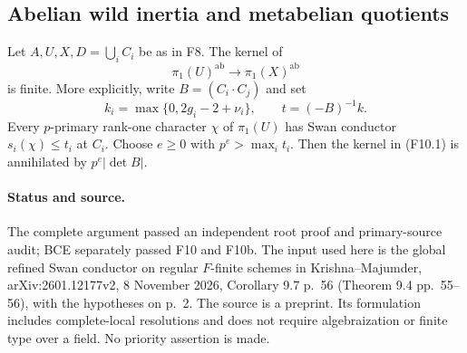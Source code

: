 \subsection{Abelian wild inertia and metabelian quotients}

\begin{proposition}
Let $A,U,X,D=\bigcup_iC_i$ be as in F8. The kernel of
\[
 \pi_1(U)^{\mathrm{ab}}\longrightarrow\pi_1(X)^{\mathrm{ab}}
 \tag{F10.1}
\]
is finite. More explicitly, write $B=(C_i\cdot C_j)$ and set
\[
 k_i=\max\{0,2g_i-2+\nu_i\},\qquad
 t=(-B)^{-1}k.
 \tag{F10.2}
\]
Every $p$-primary rank-one character $\chi$ of $\pi_1(U)$ has
Swan conductor $s_i(\chi)\leq t_i$ at $C_i$.
Choose $e\geq0$ with $p^e>\max_i t_i$. Then the kernel in
(F10.1) is annihilated by $p^e|\det B|$.
\end{proposition}

\paragraph{Status and source.}
The complete argument passed an independent root proof and primary-source
audit; BCE separately passed F10 and F10b. The input used here is the
global refined Swan conductor on regular $F$-finite
schemes in Krishna--Majumder, arXiv:2601.12177v2, 8 November 2026,
Corollary 9.7 p.~56 (Theorem 9.4 pp.~55--56), with the hypotheses
on p.~2. The source is a preprint. Its formulation includes
complete-local resolutions and does not require algebraization
or finite type over a field. No priority assertion is made.

